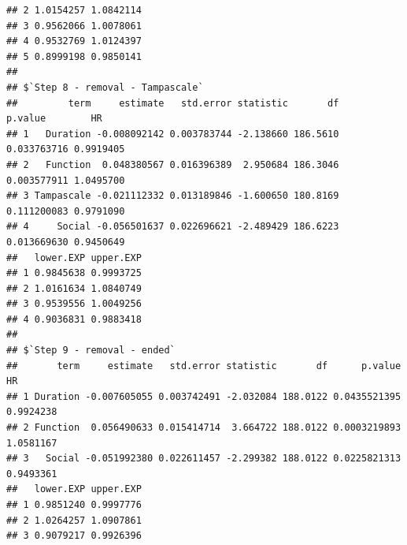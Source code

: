 \documentclass[
]{book}
\newenvironment{Shaded}{\begin{snugshade}}{\end{snugshade}}
\newcommand{\NormalTok}[1]{#1}
\newcommand{\SpecialCharTok}[1]{\textcolor[rgb]{0.00,0.00,0.00}{#1}}
\begin{document}
\begin{verbatim}
## 2 1.0154257 1.0842114
## 3 0.9562066 1.0078061
## 4 0.9532769 1.0124397
## 5 0.8999198 0.9850141
## 
## $`Step 8 - removal - Tampascale`
##         term     estimate   std.error statistic       df     p.value        HR
## 1   Duration -0.008092142 0.003783744 -2.138660 186.5610 0.033763716 0.9919405
## 2   Function  0.048380567 0.016396389  2.950684 186.3046 0.003577911 1.0495700
## 3 Tampascale -0.021112332 0.013189846 -1.600650 180.8169 0.111200083 0.9791090
## 4     Social -0.056501637 0.022696621 -2.489429 186.6223 0.013669630 0.9450649
##   lower.EXP upper.EXP
## 1 0.9845638 0.9993725
## 2 1.0161634 1.0840749
## 3 0.9539556 1.0049256
## 4 0.9036831 0.9883418
## 
## $`Step 9 - removal - ended`
##       term     estimate   std.error statistic       df      p.value        HR
## 1 Duration -0.007605055 0.003742491 -2.032084 188.0122 0.0435521395 0.9924238
## 2 Function  0.056490633 0.015414714  3.664722 188.0122 0.0003219893 1.0581167
## 3   Social -0.051992380 0.022611457 -2.299382 188.0122 0.0225821313 0.9493361
##   lower.EXP upper.EXP
## 1 0.9851240 0.9997776
## 2 1.0264257 1.0907861
## 3 0.9079217 0.9926396
\end{verbatim}

\begin{Shaded}
\end{Shaded}
\end{document}
